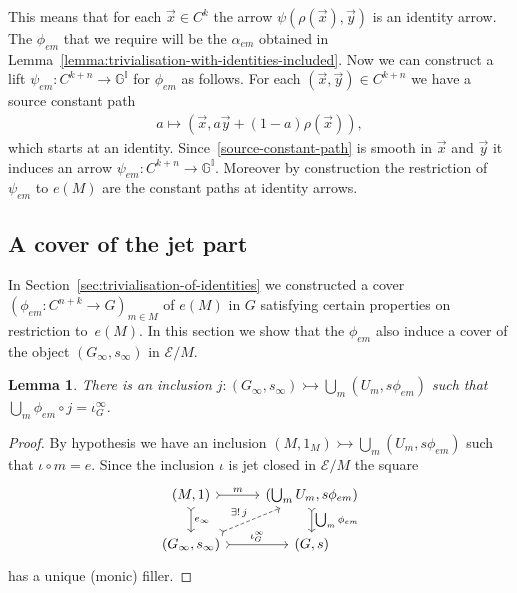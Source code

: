 \documentclass[pdftex]{sigma}
\numberwithin{equation}{section}
\newtheorem{Lemma}[Theorem]{Lemma}
\begin{document}
This means that for each $\vec{x}\in C^k$ the arrow $\psi(\rho(\vec{x}),\vec{y})$ is an identity arrow. The $\phi_{em}$ that we require will be the $\alpha_{em}$ obtained in Lemma~\ref{lemma:trivialisation-with-identities-included}. Now we can construct a lift $\psi_{em}\colon C^{k+n} \rightarrow \mathbb{G}^{\mathbb{I}}$ for $\phi_{em}$ as follows. For each $(\vec{x},\vec{y})\in C^{k+n}$ we have a source constant path
\begin{gather}\label{source-constant-path}
 a \mapsto (\vec{x}, a\vec{y}+(1-a)\rho(\vec{x})),
\end{gather}
which starts at an identity. Since~\eqref{source-constant-path} is smooth in $\vec{x}$ and $\vec{y}$ it induces an arrow $\psi_{em}\colon C^{k+n} \rightarrow \mathbb{G}^{\mathbb{I}}$. Moreover by construction the restriction of $\psi_{em}$ to $e(M)$ are the constant paths at identity arrows.

\subsection{A cover of the jet part}\label{sec:cover-of-jet-part}

In Section~\ref{sec:trivialisation-of-identities} we constructed a cover $(\phi_{em}\colon C^{n+k}\rightarrow G)_{m\in M}$ of $e(M)$ in $G$ satisfying certain properties on restriction to~$e(M)$. In this section we show that the $\phi_{em}$ also induce a cover of the object $(G_{\infty},s_{\infty})$ in $\mathcal{E}/M$.

\begin{Lemma}\label{lemma:Lifting Cover to Ginfty}
There is an inclusion $j\colon (G_{\infty},s_{\infty})\rightarrowtail \bigcup_{m}(U_{m},s\phi_{em})$ such that $\bigcup_m \phi_{em} \circ j=\iota_{G}^{\infty}$.
\end{Lemma}
\begin{proof}
By hypothesis we have an inclusion $(M,1_M)\rightarrowtail \bigcup_{m}(U_{m},s\phi_{em})$ such that $\iota\circ m=e$. Since the inclusion $\iota$ is jet closed in $\mathcal{E}/M$ the square
\begin{equation*}\begin{tikzcd}
(M,1) \dar[rightarrowtail]{e_{\infty}} \rar[rightarrowtail]{m} & (\bigcup_{m}U_{m},s\phi_{em}) \dar[rightarrowtail]{\bigcup_m \phi_{em}} \\
(G_{\infty},s_{\infty}) \urar[rightarrowtail,dashed]{\exists !\, j} \rar[rightarrowtail]{\iota_{G}^{\infty}} & (G,s)
\end{tikzcd}\end{equation*}
has a unique (monic) f\/iller.
\end{proof}
\end{document}
